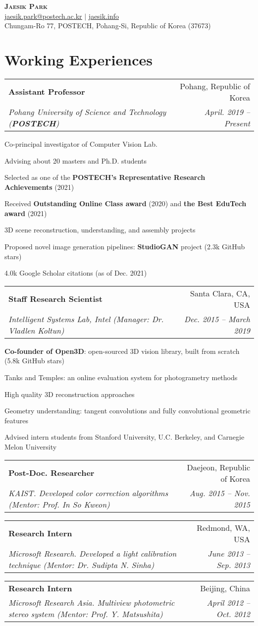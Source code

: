 \documentclass[letterpaper,11pt]{article}
\makeatletter
\newcommand{\resumeItem}[1]{
  \small{
  \item{#1 \vspace{-2pt}}
  }
}
\newcommand{\resumeSubheading}[4]{
  \vspace{-2pt}\item
    \begin{tabular*}{0.97\textwidth}[t]{l@{\extracolsep{\fill}}r}
      \textbf{#1} & #2 \\
      \textit{\small#3} & \textit{\small #4} \\
    \end{tabular*}\vspace{-7pt}
}
\newcommand{\resumeSubHeadingListStart}{\begin{itemize}[leftmargin=0.15in, label={}]}
\newcommand{\resumeSubHeadingListEnd}{\end{itemize}}
\newcommand{\resumeItemListStart}{\begin{itemize}}
\newcommand{\resumeItemListEnd}{\end{itemize}\vspace{-5pt}}
\makeatother
\begin{document}
\begin{center}
    \textbf{\Huge \scshape Jaesik Park} \\ \vspace{3pt}
    \small \href{mailto:jaesik.park@postech.ac.kr}{\underline{jaesik.park@postech.ac.kr}} $|$ 
    \href{http://jaesik.info}{\underline{jaesik.info}}\\
    \footnotesize{Chungam-Ro 77, POSTECH, Pohang-Si, Republic of Korea (37673)}
\end{center}

\section{Working Experiences}
  \resumeSubHeadingListStart
    \resumeSubheading
      {Assistant Professor}{Pohang, Republic of Korea}
      {Pohang University of Science and Technology \textnormal{(\textbf{POSTECH})}}{April. 2019 -- Present}
        \resumeItemListStart
          \resumeItem{Co-principal investigator of Computer Vision Lab.}
          \resumeItem{Advising about 20 masters and Ph.D. students}
          \resumeItem{Selected as one of the \textbf{POSTECH's Representative Research Achievements} (2021)}
          \resumeItem{Received \textbf{Outstanding Online Class award} (2020) and \textbf{the Best EduTech award} (2021)}
          \resumeItem{3D scene reconstruction, understanding, and assembly projects}
          \resumeItem{Proposed novel image generation pipelines: \textbf{StudioGAN} project (2.3k GitHub stars)}
          \resumeItem{4.0k Google Scholar citations (as of Dec. 2021)}
        \resumeItemListEnd
    \resumeSubheading
      {Staff Research Scientist}{Santa Clara, CA, USA}
      {Intelligent Systems Lab, Intel (Manager: Dr. Vladlen Koltun)}{Dec. 2015 -- March 2019}
        \resumeItemListStart
          \resumeItem{\textbf{Co-founder of Open3D}: open-sourced 3D vision library, built from scratch (5.8k GitHub stars)}
          \resumeItem{Tanks and Temples: an online evaluation system for photogrametry methods}
          \resumeItem{High quality 3D reconstruction approaches}
          \resumeItem{Geometry understanding: tangent convolutions and fully convolutional geometric features}
          \resumeItem{Advised intern students from Stanford University, U.C. Berkeley, and Carnegie Melon University}
        \resumeItemListEnd
    \resumeSubheading
      {Post-Doc. Researcher}{Daejeon, Republic of Korea}
      {KAIST. Developed color correction algorithms (Mentor: Prof. In So Kweon)}{Aug. 2015 -- Nov. 2015}
    \resumeSubheading
      {Research Intern}{Redmond, WA, USA}
      {Microsoft Research. Developed a light calibration technique (Mentor: Dr. Sudipta N. Sinha)}{June 2013 -- Sep. 2013}
    \resumeSubheading
      {Research Intern}{Beijing, China}
      {Microsoft Research Asia. Multiview photometric stereo system (Mentor: Prof. Y. Matsushita)}{April 2012 -- Oct. 2012}     
  \resumeSubHeadingListEnd
\end{document}
